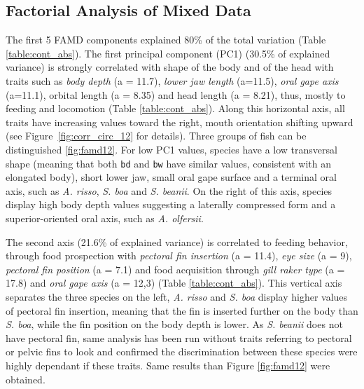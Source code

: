 
\subsection{Factorial Analysis of Mixed Data}

The first 5 FAMD components explained 80\% of the total variation (Table \ref{table:cont_abs}). The first principal component (PC1) (30.5\% of explained variance) is strongly correlated with shape of the body and of the head with traits such as \emph{body depth} (a = 11.7), \emph{lower jaw length} (a=11.5), \emph{oral gape axis} (a=11.1), orbital length (a = 8.35) and head length (a = 8.21), thus, mostly to feeding and locomotion (Table \ref{table:cont_abs}). Along this horizontal axis, all traits have increasing values toward the right, mouth orientation shifting upward (see Figure~\ref{fig:corr_circ_12} for details). Three groups of fish can be distinguished \ref{fig:famd12}. For low PC1 values, species have a low transversal shape (meaning that both \texttt{bd} and \texttt{bw} have similar values, consistent with an elongated body), short lower jaw, small oral gape surface and a terminal oral axis, such as \textit{A. risso}, \textit{S. boa} and \textit{S. beanii}. On the right of this axis, species display high body depth values suggesting a laterally compressed form and a superior-oriented oral axis, such as \textit{A. olfersii}. 

The second axis (21.6\% of explained variance) is correlated to feeding behavior, through food prospection with \emph{pectoral fin insertion} (a = 11.4), \emph{eye size} (a = 9), \emph{pectoral fin position} (a = 7.1) and food acquisition through \emph{gill raker type} (a = 17.8) and \emph{oral gape axis} (a = 12,3) (Table \ref{table:cont_abs}). This vertical axis separates the three species on the left, \textit{A. risso} and \textit{S. boa} display higher values of pectoral fin insertion, meaning that the fin is inserted further on the body than \textit{S. boa}, while the fin position on the body depth is lower. As \textit{S. beanii} does not have pectoral fin, same analysis has been run without traits referring to pectoral or pelvic fins to look and confirmed the discrimination between these species were highly dependant if these traits. Same results than Figure \ref{fig:famd12} were obtained.

